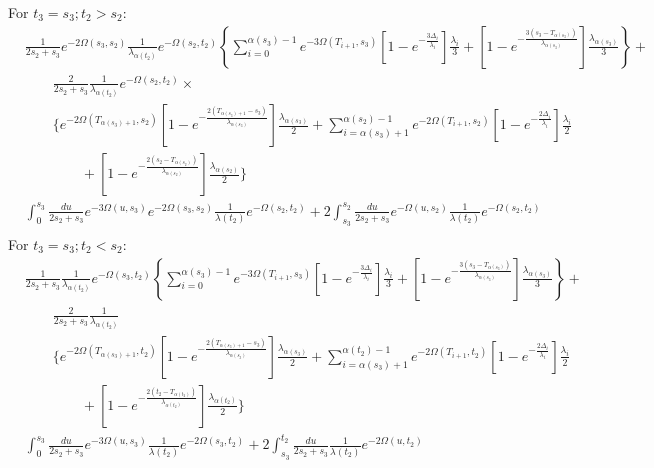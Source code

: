 \documentclass{article}
\begin{document}
For $t_3=s_3;t_2>s_2$:
\begin{align*}
    &\frac{1}{2s_2+s_3}e^{-2\Omega(s_3,s_2)}\frac{1}{\lambda_{\alpha(t_2)}}e^{-\Omega(s_2,t_2)}
    \left\{\sum_{i=0}^{\alpha(s_3)-1}e^{-3\Omega(T_{i+1},s_3)}
        \left[1-e^{-\frac{3\Delta_i}{\lambda_i}}\right]\frac{\lambda_i}{3}+
    \left[1-e^{-\frac{3\left(s_3-T_{\alpha(s_3)}\right)}{\lambda_{\alpha(s_3)}}}\right]
        \frac{\lambda_{\alpha(s_3)}}{3}\right\}+\\
    &\qquad\frac{2}{2s_2+s_3}\frac{1}{\lambda_{\alpha(t_2)}}e^{-\Omega(s_2,t_2)}\times\\
    &\qquad\Bigg\{e^{-2\Omega(T_{\alpha(s_3)+1},s_2)}\left[1-e^{-\frac{2\left(T_{\alpha(s_3)+1}-s_3\right)}{\lambda_{\alpha(s_3)}}}\right]\frac{\lambda_{\alpha(s_3)}}{2}+\sum_{i=\alpha(s_3)+1}^{\alpha(s_2)-1}e^{-2\Omega\left(T_{i+1},s_2\right)}\left[1-e^{-\frac{2\Delta_i}{\lambda_i}}\right]\frac{\lambda_i}{2}\\
    &\qquad\qquad+\left[1-e^{-\frac{2\left(s_2-T_{\alpha(s_2)}\right)}{\lambda_{\alpha(s_2)}}}\right]\frac{\lambda_{\alpha(s_2)}}{2}
    \Bigg\}
    \\
    &\int_0^{s_3}\frac{du}{2s_2+s_3}e^{-3\Omega(u,s_3)}e^{-2\Omega(s_3,s_2)}\frac{1}{\lambda(t_2)}e^{-\Omega(s_2,t_2)}+
    2\int_{s_3}^{s_2}\frac{du}{2s_2+s_3}e^{-\Omega(u,s_2)}\frac{1}{\lambda(t_2)}e^{-\Omega(s_2,t_2)}\\
\end{align*}
For $t_3=s_3; t_2<s_2$:
\begin{align*}
    &\frac{1}{2s_2+s_3}\frac{1}{\lambda_{\alpha(t_2)}}e^{-\Omega(s_3,t_2)}
    \left\{\sum_{i=0}^{\alpha(s_3)-1}e^{-3\Omega(T_{i+1},s_3)}
        \left[1-e^{-\frac{3\Delta_i}{\lambda_i}}\right]\frac{\lambda_i}{3}+
    \left[1-e^{-\frac{3\left(s_3-T_{\alpha(s_3)}\right)}{\lambda_{\alpha(s_3)}}}\right]
        \frac{\lambda_{\alpha(s_3)}}{3}\right\}+\\
        &\qquad\frac{2}{2s_2+s_3}\frac{1}{\lambda_{\alpha(t_2)}}\\
    &\qquad\Bigg\{e^{-2\Omega(T_{\alpha(s_3)+1},t_2)}\left[1-e^{-\frac{2\left(T_{\alpha(s_3)+1}-s_3\right)}{\lambda_{\alpha(s_3)}}}\right]\frac{\lambda_{\alpha(s_3)}}{2}+\sum_{i=\alpha(s_3)+1}^{\alpha(t_2)-1}e^{-2\Omega\left(T_{i+1},t_2\right)}\left[1-e^{-\frac{2\Delta_i}{\lambda_i}}\right]\frac{\lambda_i}{2}\\
    &\qquad\qquad+\left[1-e^{-\frac{2\left(t_2-T_{\alpha(t_2)}\right)}{\lambda_{\alpha(t_2)}}}\right]\frac{\lambda_{\alpha(t_2)}}{2}
    \Bigg\}\\
    &\int_0^{s_3}\frac{du}{2s_2+s_3}e^{-3\Omega(u,s_3)}\frac{1}{\lambda(t_2)}e^{-2\Omega(s_3,t_2)}+
    2\int_{s_3}^{t_2}\frac{du}{2s_2+s_3}\frac{1}{\lambda(t_2)}e^{-2\Omega(u,t_2)}\\
\end{align*}
\end{document}
